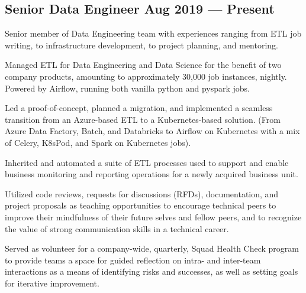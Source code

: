 \documentclass[letter,10pt]{article}
\begin{document}
\subsection{{Senior Data Engineer \hfill Aug 2019 --- Present}}

\vspace{10pt}

Senior member of Data Engineering team with experiences ranging from ETL job writing, to infrastructure development, to project planning, and mentoring.

\vspace{10pt}

\begin{zitemize}
    \item Managed ETL for Data Engineering and Data Science for the benefit of two company products, amounting to approximately 30,000 job instances, nightly. Powered by Airflow, running both vanilla python and pyspark jobs.
    \item Led a proof-of-concept, planned a migration, and implemented a seamless transition from an Azure-based ETL to a Kubernetes-based solution. (From Azure Data Factory, Batch, and Databricks to Airflow on Kubernetes with a mix of Celery, K8sPod, and Spark on Kubernetes jobs).
    \item Inherited and automated a suite of ETL processes used to support and enable business monitoring and reporting operations for a newly acquired business unit.
    \item Utilized code reviews, requests for discussions (RFDs), documentation, and project proposals as teaching opportunities to encourage technical peers to improve their mindfulness of their future selves and fellow peers, and to recognize the value of strong communication skills in a technical career.
    \item Served as volunteer for a company-wide, quarterly, Squad Health Check program to provide teams a space for guided reflection on intra- and inter-team interactions as a means of identifying risks and successes, as well as setting goals for iterative improvement.
\end{zitemize}

\vspace{5pt}
\vspace{5pt}

\end{document}
